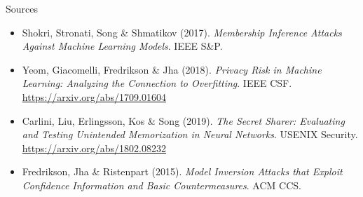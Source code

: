 \documentclass[11pt]{beamer}
\begin{document}
\begin{frame}{Sources}
  \footnotesize
  \begin{itemize}
    \item Shokri, Stronati, Song \& Shmatikov (2017). \emph{Membership
          Inference Attacks Against Machine Learning Models}. IEEE S\&P.
    \item Yeom, Giacomelli, Fredrikson \& Jha (2018). \emph{Privacy Risk
          in Machine Learning: Analyzing the Connection to Overfitting}.
          IEEE CSF. \url{https://arxiv.org/abs/1709.01604}
    \item Carlini, Liu, Erlingsson, Kos \& Song (2019). \emph{The Secret
          Sharer: Evaluating and Testing Unintended Memorization in
          Neural Networks}. USENIX Security.
          \url{https://arxiv.org/abs/1802.08232}
    \item Fredrikson, Jha \& Ristenpart (2015). \emph{Model Inversion
          Attacks that Exploit Confidence Information and Basic
          Countermeasures}. ACM CCS.
  \end{itemize}
\end{frame}
\end{document}
